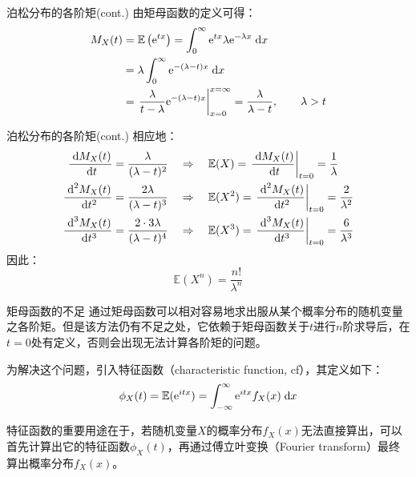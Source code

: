 \documentclass[t]{beamer}
\newcommand{\dif}{{\;\rm d}}
\newcommand{\E}{\mathbb{E}}
\begin{document}
  \begin{frame}{泊松分布的各阶矩(cont.)}
    由矩母函数的定义可得：
    \begin{equation*}\begin{split}
    M_X(t)&=\E\left({\rm e}^{tx}\right)=\int^{\infty}_0 {\rm
    e}^{tx}\lambda {\rm e}^{-\lambda x}\dif x\\
    &=\lambda \int^{\infty}_0 {\rm e}^{-(\lambda-t)x}\dif x\\
    &=\left.\frac{\lambda}{t-\lambda}{\rm
    e}^{-(\lambda-t)x}\right|^{x=\infty}_{x=0}=\frac{\lambda}{\lambda-t},\qquad
    \lambda>t
    \end{split} \end{equation*}
  \end{frame}


  \begin{frame}{泊松分布的各阶矩(cont.)}
    相应地：
    \begin{equation*}\begin{split}
    \frac{\dif M_X(t)}{\dif
    t}=\frac{\lambda}{(\lambda-t)^2}&\quad\Rightarrow\quad \E
    (X)=\left.\frac{\dif M_X(t)}{\dif
    t}\right|_{t=0}=\frac{1}{\lambda}\\
    \frac{\dif^2 M_X(t)}{\dif
    t^2}=\frac{2\lambda}{(\lambda-t)^3}&\quad\Rightarrow\quad \E
    (X^2)=\left.\frac{\dif^2 M_X(t)}{\dif
    t^2}\right|_{t=0}=\frac{2}{\lambda^2}\\
    \frac{\dif^3 M_X(t)}{\dif t^3}=\frac{2\cdot
    3\lambda}{(\lambda-t)^4}&\quad\Rightarrow\quad \E
    (X^3)=\left.\frac{\dif^3 M_X(t)}{\dif
    t^3}\right|_{t=0}=\frac{6}{\lambda^3}\\
    \end{split}\end{equation*}
    因此：$$\E (X^n)=\frac{n!}{\lambda^n}$$
  
  \end{frame}
  
  \begin{frame}{矩母函数的不足}
    通过矩母函数可以相对容易地求出服从某个概率分布的随机变量之各阶矩。但是该方法仍有不足之处，它依赖于矩母函数关于$t$进行$n$阶求导后，在$t=0$处有定义，否则会出现无法计算各阶矩的问题。

    为解决这个问题，引入特征函数（characteristic function, cf），其定义如下：
    \begin{equation*}\phi_X(t)=\E({\rm
    e}^{itx})=\int^{\infty}_{-\infty} {\rm e}^{itx}f_X(x)\dif x
    \end{equation*}
  
    特征函数的重要用途在于，若随机变量$X$的概率分布$f_X(x)$无法直接算出，可以首先计算出它的特征函数$\phi_X(t)$，再通过傅立叶变换（Fourier
transform）最终算出概率分布$f_X(x)$。
  \end{frame}
\end{document}
